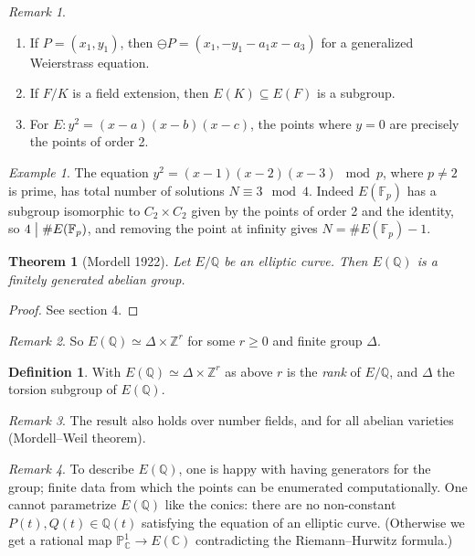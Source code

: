 \documentclass[a4paper]{article}
\theoremstyle{plain}
\newtheorem{theorem}{Theorem}
\theoremstyle{remark}
\newtheorem*{remark}{Remark}
\newtheorem*{example}{Example}
\theoremstyle{definition}
\newtheorem*{definition}{Definition}
\newcommand{\divides}{\bigm|}
\renewcommand{\P}{\mathbb{P}}
\newcommand{\F}{\mathbb{F}}
\newcommand{\Z}{\mathbb{Z}}
\newcommand{\Q}{\mathbb{Q}}
\newcommand{\C}{\mathbb{C}}
\begin{document}
\begin{remark}
    \begin{enumerate}[label=(\roman*)]
        \item If $P=(x_1,y_1)$, then $\ominus P=(x_1,-y_1-a_1x-a_3)$ for a
            generalized Weierstrass equation.

        \item If $F/K$ is a field extension, then $E(K)\subseteq E(F)$ is a
            subgroup.

        \item For $E:y^2=(x-a)(x-b)(x-c)$, the points where $y=0$ are precisely
            the points of order 2.
    \end{enumerate}
\end{remark}

\begin{example}
    The equation $y^2=(x-1)(x-2)(x-3)\mod p$, where $p\ne2$ is prime, has
    total number of solutions $N\equiv3\mod 4$. Indeed $E(\F_p)$ has a subgroup
    isomorphic to $C_2\times C_2$ given by the points of order 2 and the
    identity, so $4\divides\#E(\F_p)$, and removing the point at infinity gives
    $N=\#E(\F_p)-1$.
\end{example}

\begin{theorem}[Mordell 1922]
    Let $E/\Q$ be an elliptic curve. Then $E(\Q)$ is a finitely generated
    abelian group.
\end{theorem}

\begin{proof}
    See section 4.
\end{proof}

\begin{remark}
    So $E(\Q)\simeq\Delta\times\Z^r$ for some $r\ge0$ and finite group $\Delta$.
\end{remark}

\begin{definition}
    With $E(\Q)\simeq\Delta\times\Z^r$ as above $r$ is the \emph{rank} of
    $E/\Q$, and $\Delta$ the torsion subgroup of $E(\Q)$.
\end{definition}

\begin{remark}
    The result also holds over number fields, and for all abelian varieties
    (Mordell--Weil theorem).
\end{remark}

\begin{remark}
    To describe $E(\Q)$, one is happy with having generators for the group;
    finite data from which the points can be enumerated computationally. One
    cannot parametrize $E(\Q)$ like the conics: there are no non-constant
    $P(t),Q(t)\in\Q(t)$ satisfying the equation of an elliptic curve. (Otherwise
    we get a rational map $\P^1_\C\to E(\C)$ contradicting the Riemann--Hurwitz
    formula.)
\end{remark}
\end{document}
